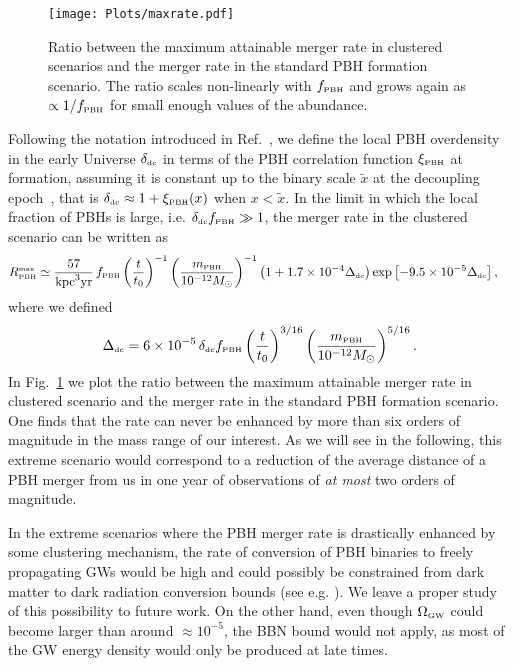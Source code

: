 \documentclass[11pt,a4paper]{article}
\newcommand{\be}{\begin{equation}}
\newcommand{\ee}{\end{equation}}
\newcommand{\lp }{\left (}
\newcommand{\llp }{\left [}
\newcommand{\rp }{\right )}
\newcommand{\rrp }{\right ]}
\newcommand{\PBH}{\text{\tiny PBH}}
\begin{document}
\begin{figure}[t!]
\centering
\texttt{[image: Plots/maxrate.pdf]}
\caption{
Ratio between the maximum attainable merger rate in clustered scenarios and the merger rate in the standard PBH formation scenario. The ratio scales non-linearly with $f_\PBH$ and grows again as $\propto 1/f_\text{\tiny PBH}$ for small enough values of the abundance. 
%
}\label{fig: max rate}
\end{figure}

Following the notation introduced in Ref.~\cite{Raidal:2017mfl},
we define the local PBH overdensity in the early Universe  $\delta_\text{\tiny dc}$ in terms of the PBH correlation function $\xi_\text{\tiny  PBH}$ at formation, assuming it is constant up to the binary scale $\tilde{x}$ at the decoupling epoch~\cite{Tada:2015noa, Raidal:2017mfl, Suyama:2019cst, Atal:2020yic, DeLuca:2021hcf}, that is $\delta_\text{\tiny dc} \approx 1 + \xi_\text{\tiny  PBH}  (x)$ when $x < \tilde{x}$.
In the limit in which the local fraction of PBHs is large,
 i.e. $\delta_\text{\tiny dc} f_\PBH \gg 1$, the merger rate in the clustered scenario can be written as \cite{DeLuca:2021hde}
\begin{align}
\label{eq:PBHrateclu}
R^\text{\tiny max}_\PBH
	&\simeq 
	\frac{57}{{\rm kpc}^3 {\rm yr}}
	\,
	 f_\PBH 	\lp \frac{t}{t_0}\rp^{-1}  \lp \frac{m_\PBH}{10^{-12} M_\odot}\rp^{-1}  \lp 1 + 1.7 \times 10^{-4} \Delta_\text{\tiny dc} \rp \exp\llp- 9.5 \times 10^{-5} \Delta_\text{\tiny dc}\rrp,
\end{align}
where we defined 
\be
\label{eq:critdc}
\Delta_\text{\tiny dc} =  
6 \times 10^{-5}\,
\delta_\text{\tiny dc} f_\PBH 	\lp \frac{t}{t_0}\rp^{3/16}  \lp \frac{m_\PBH}{10^{-12} M_\odot}\rp^{5/16}.
\ee
In Fig.~\ref{fig: max rate} we plot the ratio between the maximum attainable merger rate in clustered scenario and the merger rate in the standard PBH formation scenario. 
One finds that the rate can never be enhanced by more than six orders of magnitude in the mass range of our interest.
As we will see in the following, this extreme scenario would correspond to a reduction of the average distance of a
PBH merger from us in one year of observations of {\it at most} two orders of magnitude.

In the extreme scenarios where the PBH merger rate is drastically enhanced by some clustering mechanism, 
the rate of conversion of PBH binaries to freely propagating GWs would be high and could possibly be constrained from dark matter to dark radiation conversion bounds (see e.g. \cite{DES:2020mpv}).
We leave a proper study of this possibility to future work. 
On the other hand, even though $\Omega_\text{\tiny GW}$ could  become larger than around $\approx 10^{-5}$, the BBN bound would not apply, as most of the GW energy density 
would only be produced at late times. 
\end{document}
